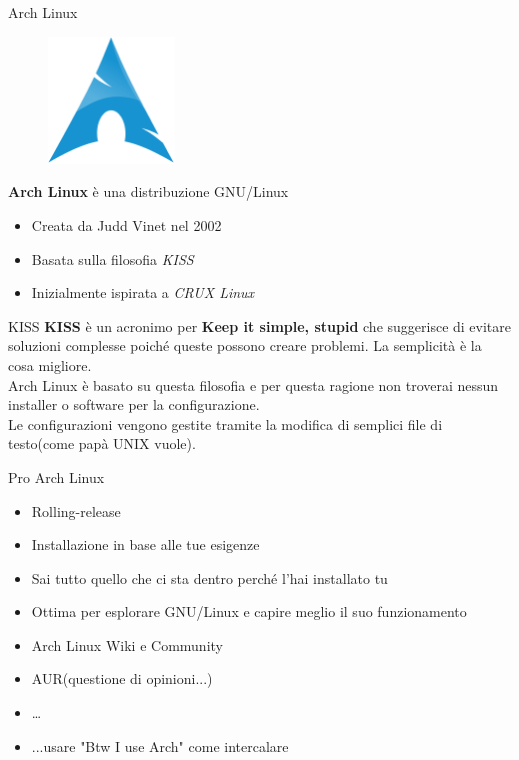 \begin{frame}{Arch Linux}
    \begin{figure}[h]
        \includegraphics[width=0.3\textwidth]{images/Archlinux-icon-crystal-64.png}
    \end{figure}
    \textbf{Arch Linux} è una distribuzione GNU/Linux\\

    \begin{itemize}
        \item Creata da Judd Vinet nel 2002
        \item Basata sulla filosofia \textit{KISS}
        \item Inizialmente ispirata a \textit{CRUX Linux}
    \end{itemize}
\end{frame}


\begin{frame}{KISS}
    \textbf{KISS} è un acronimo per \textbf{Keep it simple, stupid} che suggerisce di evitare soluzioni  complesse
    poiché queste possono creare problemi. La semplicità è la cosa migliore.\\

    Arch Linux è basato su questa filosofia e per questa ragione non troverai nessun installer o software per la configurazione.\\
    Le configurazioni vengono gestite tramite la modifica di semplici file di testo(come papà UNIX vuole).
\end{frame}


\begin{frame}{Pro Arch Linux}
    \begin{itemize}
        \item Rolling-release
        \item Installazione in base alle tue esigenze
        \item Sai tutto quello che ci sta dentro perché l'hai installato tu
        \item Ottima per esplorare GNU/Linux e capire meglio il suo funzionamento
        \item Arch Linux Wiki e Community
        \item AUR(questione di opinioni...)
        \item \dots
        \item ...usare "Btw I use Arch" come intercalare
    \end{itemize}

\end{frame}

